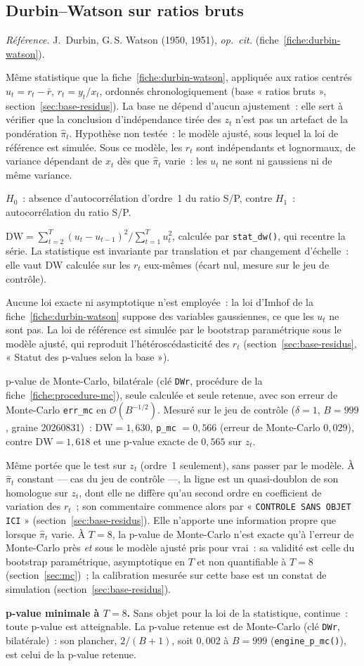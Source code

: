 \documentclass[a4paper,11pt]{article}
\newcommand{\code}[1]{\texttt{\small #1}}
\newcommand{\refl}[1]{{\small\textcolor{maincolor!70!black}{\textit{Référence.} #1}}\par\smallskip}
\newcounter{ficheid}
\newenvironment{fiche}[1]{%
  \stepcounter{ficheid}%
  \phantomsection
  \subsection{#1}%
  \label{fiche:\theficheid}%
}{%
  \end{description}\vspace{0.5em}%
}
\newcommand{\Cadre}{%
  \begin{description}[leftmargin=0pt, style=unboxed, itemsep=3pt, topsep=3pt, parsep=2pt]%
  \item[\textcolor{financeblue}{\textbf{1. Cadre, notations et hypothèses de validité (non testées).}}]}
\newcommand{\Hzero}{\item[\textcolor{financeblue}{\textbf{2. Hypothèse nulle.}}]}
\newcommand{\Stat}{\item[\textcolor{financeblue}{\textbf{3. Statistique de test.}}]}
\newcommand{\Loi}{\item[\textcolor{financeblue}{\textbf{4. Loi sous $H_0$.}}]}
\newcommand{\Pval}{\item[\textcolor{financeblue}{\textbf{5. p-value.}}]}
\newcommand{\Usage}{\item[\textcolor{financeblue}{\textbf{6. Usage et limites.}}]}
\newcommand{\Pertinence}{\item[\textcolor{financeblue}{\textbf{7. Pertinence et puissance à faible $T$.}}]}
\begin{document}
\begin{fiche}{Durbin--Watson sur ratios bruts}
\label{fiche:durbin-watson-ratios-bruts}%
\refl{J.~Durbin, G.\,S. Watson (1950, 1951), \emph{op.\ cit.} (fiche~\ref{fiche:durbin-watson}).}
\Cadre
Même statistique que la fiche~\ref{fiche:durbin-watson}, appliquée aux ratios centrés
$u_t = r_t - \bar r$, $r_t = y_t/x_t$, ordonnés chronologiquement (base « ratios bruts »,
section~\ref{sec:base-residus}). La base ne dépend d'aucun ajustement~: elle sert à vérifier
que la conclusion d'indépendance tirée des $z_t$ n'est pas un artefact de la pondération
$\hat\pi_t$. Hypothèse non testée~: le modèle ajusté, sous lequel la loi de référence est simulée.
Sous ce modèle, les $r_t$ sont indépendants et lognormaux, de variance dépendant de $x_t$ dès
que $\hat\pi_t$ varie~: les $u_t$ ne sont ni gaussiens ni de même variance.
\Hzero
$H_0$~: absence d'autocorrélation d'ordre~1 du ratio S/P, contre $H_1$~: autocorrélation du
ratio S/P.
\Stat
$\mathrm{DW} = \sum_{t=2}^{T}(u_t - u_{t-1})^2 \big/ \sum_{t=1}^{T} u_t^2$, calculée par
\code{stat\_dw()}, qui recentre la série. La statistique est invariante par translation et par
changement d'échelle~: elle vaut $\mathrm{DW}$ calculée sur les $r_t$ eux-mêmes (écart nul,
mesure sur le jeu de contrôle).
\Loi
Aucune loi exacte ni asymptotique n'est employée~: la loi d'Imhof de la
fiche~\ref{fiche:durbin-watson} suppose des variables gaussiennes, ce que les $u_t$ ne sont
pas. La loi de référence est simulée par le bootstrap paramétrique sous le modèle ajusté, qui
reproduit l'hétéroscédasticité des $r_t$ (section~\ref{sec:base-residus}, « Statut des p-values
selon la base »).
\Pval
p-value de Monte-Carlo, bilatérale (clé \code{DWr}, procédure de la
fiche~\ref{fiche:procedure-mc}), seule calculée et seule retenue, avec son erreur de
Monte-Carlo \code{err\_mc} en $\mathcal{O}(B^{-1/2})$. Mesuré sur le jeu de contrôle
($\hat\delta = 1$, $B = 999$, graine 20260831)~: $\mathrm{DW} = 1{,}630$, \code{p\_mc}
$= 0{,}566$ (erreur de Monte-Carlo $0{,}029$), contre $\mathrm{DW} = 1{,}618$ et une p-value
exacte de $0{,}565$ sur $z_t$.
\Usage
Même portée que le test sur $z_t$ (ordre~1 seulement), sans passer par le modèle. À
$\hat\pi_t$ constant --- cas du jeu de contrôle ---, la ligne est un quasi-doublon de son
homologue sur $z_t$, dont elle ne diffère qu'au second ordre en coefficient de variation des
$r_t$~; son commentaire commence alors par « \code{CONTROLE SANS OBJET ICI} »
(section~\ref{sec:base-residus}). Elle n'apporte une information propre que lorsque
$\hat\pi_t$ varie. À $T = 8$, la p-value de Monte-Carlo n'est exacte qu'à l'erreur de
Monte-Carlo près \emph{et} sous le modèle ajusté pris pour vrai~: sa validité est celle du
bootstrap paramétrique, asymptotique en $T$ et non quantifiable à $T = 8$
(section~\ref{sec:mc})~; la calibration mesurée sur cette base est un constat de simulation
(section~\ref{sec:base-residus}).
\Pertinence
\textbf{p-value minimale à $T = 8$.} Sans objet pour la loi de la statistique, continue~: toute p-value est atteignable. La p-value retenue est de Monte-Carlo (clé \code{DWr}, bilatérale)~: son plancher, $2/(B+1)$, soit $0{,}002$ à $B = 999$ (\code{engine\_p\_mc()}), est celui de la p-value retenue.


\end{fiche}
\end{document}
